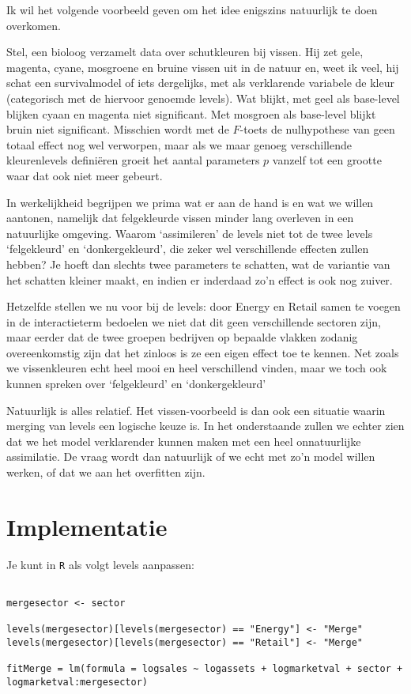 \documentclass[a4paper]{report}
\begin{document}
  Ik wil het volgende voorbeeld geven om het idee enigszins natuurlijk te doen overkomen. 
  
  Stel, een bioloog verzamelt data over schutkleuren bij vissen. Hij zet gele, magenta, cyane, mosgroene en bruine vissen uit in de natuur en, weet ik veel, hij schat een survivalmodel of iets dergelijks, met als verklarende variabele de kleur (categorisch met de hiervoor genoemde levels). Wat blijkt, met geel als base-level blijken cyaan en magenta niet significant. Met mosgroen als base-level blijkt bruin niet significant. Misschien wordt met de $F$-toets de nulhypothese van geen totaal effect nog wel verworpen, maar als we maar genoeg verschillende kleurenlevels defini\"eren groeit het aantal parameters $p$ vanzelf tot een grootte waar dat ook niet meer gebeurt.
  
  In werkelijkheid begrijpen we prima wat er aan de hand is en wat we willen aantonen, namelijk dat felgekleurde vissen minder lang overleven in een natuurlijke omgeving. Waarom `assimileren' de levels niet tot de twee levels `felgekleurd' en `donkergekleurd', die zeker wel verschillende effecten zullen hebben? Je hoeft dan slechts twee parameters te schatten, wat de variantie van het schatten kleiner maakt, en indien er inderdaad zo'n effect is ook nog zuiver.
  
  Hetzelfde stellen we nu voor bij de levels: door Energy en Retail samen te voegen in de interactieterm bedoelen we niet dat dit geen verschillende sectoren zijn, maar eerder dat de twee groepen bedrijven op bepaalde vlakken zodanig overeenkomstig zijn dat het zinloos is ze een eigen effect toe te kennen. Net zoals we vissenkleuren echt heel mooi en heel verschillend vinden, maar we toch ook kunnen spreken over `felgekleurd' en `donkergekleurd'
  
  Natuurlijk is alles relatief. Het vissen-voorbeeld is dan ook een situatie waarin merging van levels een logische keuze is. In het onderstaande zullen we echter zien dat we het model verklarender kunnen maken met een heel onnatuurlijke assimilatie. De vraag wordt dan natuurlijk of we echt met zo'n model willen werken, of dat we aan het overfitten zijn.
  
\section{Implementatie}
  Je kunt in \verb!R! als volgt levels aanpassen:
  
\begin{verbatim}

mergesector <- sector

levels(mergesector)[levels(mergesector) == "Energy"] <- "Merge"
levels(mergesector)[levels(mergesector) == "Retail"] <- "Merge"

fitMerge = lm(formula = logsales ~ logassets + logmarketval + sector + logmarketval:mergesector)
\end{verbatim}
\end{document}
